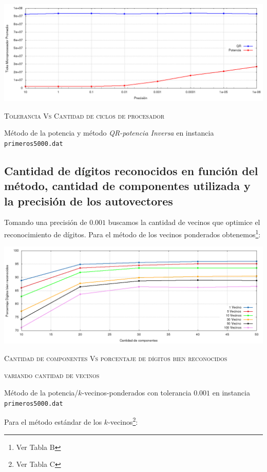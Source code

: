 	 	\vspace{5mm}
		\centerline{\includegraphics[width=20cm]{img/precVsTick.png}}
		\centerline{\textsc{Tolerancia Vs Cantidad de ciclos de procesador}}
		\centerline{M\'etodo de la potencia y m\'etodo \textit{QR-potencia Inversa} en instancia
		\texttt{primeros5000.dat}}
		\vspace{5mm}


	\subsection{Cantidad de d\'igitos reconocidos en funci\'on del m\'etodo,
	cantidad de componentes utilizada y la precisi\'on de los autovectores}

		Tomando una precisi\'on de $0.001$ buscamos la cantidad de vecinos que
		optimice el reconocimiento de d\'igitos.
		Para el m\'etodo de los vecinos ponderados obtenemos\footnote{ Ver Tabla B }:

		\vspace{5mm}
		\centerline{\includegraphics[width=20cm]{img/kPonderadosPS.png}}
		\centerline{\textsc{Cantidad de componentes Vs porcentaje de d\'igitos bien
		reconocidos}}
		\centerline{\textsc{variando cantidad de vecinos}}
		\centerline{M\'etodo de la potencia/$k$-vecinos-ponderados con tolerancia
		$0.001$ en instancia \texttt{primeros5000.dat}}
		\vspace{5mm}

		Para el m\'etodo est\'andar de los $k$-vecinos\footnote{ Ver Tabla C }:

